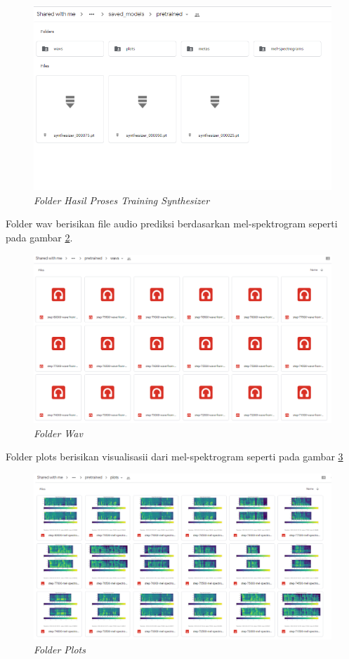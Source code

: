 \begin{enumerate}
\begin{figure}[H]
    \centering
    \includegraphics[scale=0.5]{figures/hasil18}
    \caption{\textit{Folder Hasil Proses Training Synthesizer}}
    \label{hasil18}
\end{figure}

Folder wav berisikan file audio prediksi berdasarkan mel-spektrogram seperti pada gambar \ref{hasil19}. 

\begin{figure}[H]
    \centering
    \includegraphics[scale=0.3]{figures/hasil19}
    \caption{\textit{Folder Wav}}
    \label{hasil19}
\end{figure}

Folder plots berisikan visualisasii dari mel-spektrogram seperti pada gambar \ref{hasil20}
\begin{figure}[H]
    \centering
    \includegraphics[scale=0.3]{figures/hasil20}
    \caption{\textit{Folder Plots}}
    \label{hasil20}
\end{figure}


\end{enumerate}
